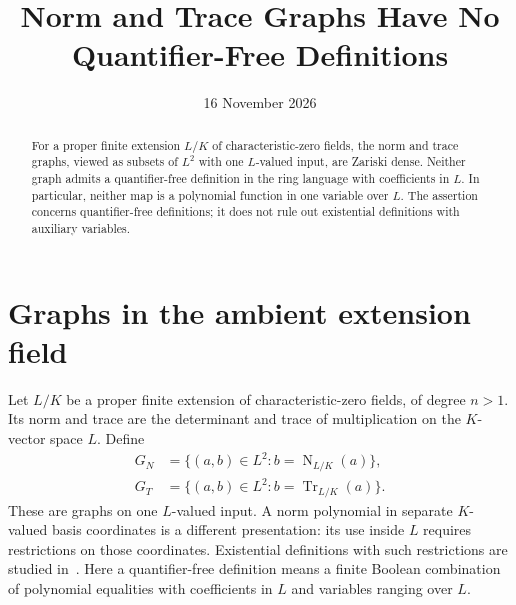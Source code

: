 \documentclass[11pt,a4paper]{article}
\title{Norm and Trace Graphs Have No Quantifier-Free Definitions}
\author{}\date{16 November 2026}
\theoremstyle{definition}\newtheorem{definition}[theorem]{Definition}
\theoremstyle{remark}\newtheorem{remark}[theorem]{Remark}
\DeclareMathOperator{\Tr}{Tr}\DeclareMathOperator{\Nm}{N}
\begin{document}
\maketitle
\begin{abstract}
For a proper finite extension $L/K$ of characteristic-zero fields,
the norm and trace graphs, viewed as subsets of $L^2$ with one
$L$-valued input, are Zariski dense. Neither graph admits a
quantifier-free definition in the ring language with coefficients
in $L$. In particular, neither map is a polynomial function in
one variable over $L$. The assertion concerns quantifier-free
definitions; it does not rule out existential definitions with
auxiliary variables.
\end{abstract}

\section{Graphs in the ambient extension field}
Let $L/K$ be a proper finite extension of characteristic-zero fields,
of degree $n>1$. Its norm and trace are the determinant and trace
of multiplication on the $K$-vector space $L$. Define
\[
\begin{split}
 G_N&=\{(a,b)\in L^2:b=\Nm_{L/K}(a)\},\\
 G_T&=\{(a,b)\in L^2:b=\Tr_{L/K}(a)\}.
\end{split}
\]
These are graphs on one $L$-valued input. A norm polynomial in
separate $K$-valued basis coordinates is a different presentation:
its use inside $L$ requires restrictions on those coordinates.
Existential definitions with such restrictions are studied
in~\cite{FieldDefinitions}. Here a quantifier-free definition means a
finite Boolean combination of polynomial equalities with coefficients
in $L$ and variables ranging over $L$.
\end{document}
